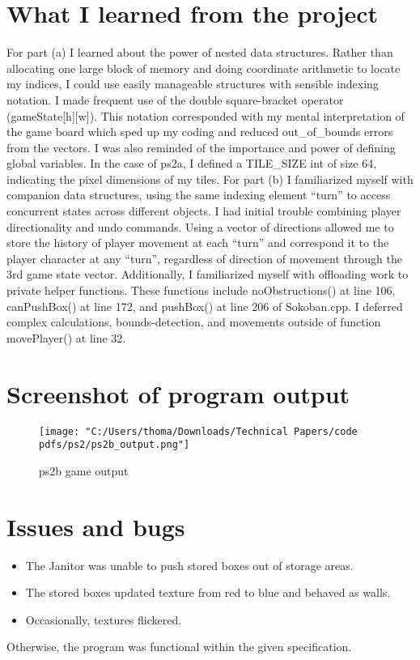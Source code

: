 \documentclass[12pt]{article}
\begin{document}
\section[3]{What I learned from the project}
\hfill\begin{minipage}{\dimexpr\textwidth-1cm}
For part (a) I learned about the power of nested data structures. Rather than allocating one large block of memory and doing coordinate arithmetic to locate my indices, I could use easily manageable structures with sensible indexing notation. I made frequent use of the double square-bracket operator (gameState[h][w]). This notation corresponded with my mental interpretation of the game board which sped up my coding and reduced out\_of\_bounds errors from the vectors. I was also reminded of the importance and power of defining global variables. In the case of ps2a, I defined a TILE\_SIZE int of size 64, indicating the pixel dimensions of my tiles. \newline
For part (b) I familiarized myself with companion data structures, using the same indexing element “turn” to access concurrent states across different objects. I had initial trouble combining player directionality and undo commands. Using a vector of directions allowed me to store the history of player movement at each “turn” and correspond it to the player character at any “turn”, regardless of direction of movement through the 3rd game state vector. \newline
Additionally, I familiarized myself with offloading work to private helper functions. These functions include noObstructions() at line 106, canPushBox() at line 172, and pushBox() at line 206 of Sokoban.cpp. I deferred complex calculations, bounds-detection, and movements outside of function movePlayer() at line 32.
\end{minipage}

\section[4]{Screenshot of program output}
\begin{figure}[H]
  \centering
  \texttt{[image: "C:/Users/thoma/Downloads/Technical Papers/code pdfs/ps2/ps2b\_output.png"]}
  \caption{ps2b game output}
  \label{fig:ps2b_output}
\end{figure}

\section[5]{Issues and bugs}
\hfill\begin{minipage}{\dimexpr\textwidth-1cm}
\begin{itemize}
\item The Janitor was unable to push stored boxes out of storage areas.
\item The stored boxes updated texture from red to blue and behaved as walls.
\item Occasionally, textures flickered.
\end{itemize}
Otherwise, the program was functional within the given specification.
\end{minipage}
\end{document}
